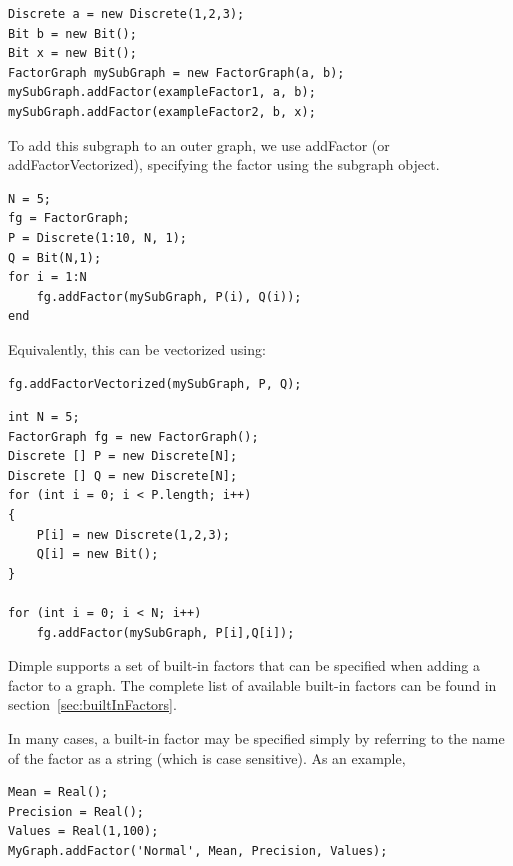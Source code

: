 \fi

\ifjava
\begin{lstlisting}
Discrete a = new Discrete(1,2,3);
Bit b = new Bit();
Bit x = new Bit();
FactorGraph mySubGraph = new FactorGraph(a, b);
mySubGraph.addFactor(exampleFactor1, a, b);
mySubGraph.addFactor(exampleFactor2, b, x);
\end{lstlisting}
\fi

To add this subgraph to an outer graph, we use addFactor \ifmatlab (or addFactorVectorized)\fi, specifying the factor using the subgraph object.

\ifmatlab

\begin{lstlisting}
N = 5;
fg = FactorGraph;
P = Discrete(1:10, N, 1);
Q = Bit(N,1);
for i = 1:N
    fg.addFactor(mySubGraph, P(i), Q(i));
end
\end{lstlisting}

Equivalently, this can be vectorized using:

\begin{lstlisting}
fg.addFactorVectorized(mySubGraph, P, Q);
\end{lstlisting}

\fi

\ifjava
\begin{lstlisting}
int N = 5;
FactorGraph fg = new FactorGraph();
Discrete [] P = new Discrete[N];
Discrete [] Q = new Discrete[N];
for (int i = 0; i < P.length; i++)
{
	P[i] = new Discrete(1,2,3);
	Q[i] = new Bit();
}

for (int i = 0; i < N; i++)
    fg.addFactor(mySubGraph, P[i],Q[i]);

\end{lstlisting}
\fi


\label{sec:usingBuiltInFactors}

Dimple supports a set of built-in factors that can be specified when adding a factor to a graph.  The complete list of available built-in factors can be found in section~\ref{sec:builtInFactors}.

\ifmatlab

In many cases, a built-in factor may be specified simply by referring to the name of the factor as a string (which is case sensitive).  As an example,

\begin{lstlisting}
Mean = Real();
Precision = Real();
Values = Real(1,100);
MyGraph.addFactor('Normal', Mean, Precision, Values);
\end{lstlisting}


